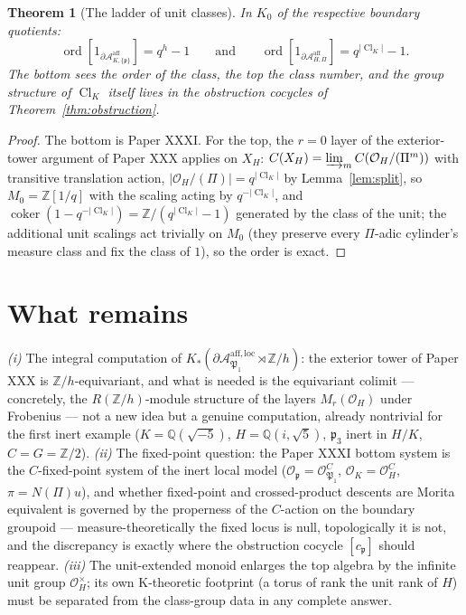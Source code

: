 \documentclass[11pt]{amsart}
\newtheorem{theorem}{Theorem}[section]
\theoremstyle{remark}
\newcommand{\OK}{\mathcal{O}_K}
\newcommand{\OH}{\mathcal{O}_H}
\newcommand{\pp}{\mathfrak{p}}
\newcommand{\PP}{\mathfrak{P}}
\newcommand{\Z}{\mathbb{Z}}
\newcommand{\Q}{\mathbb{Q}}
\newcommand{\Cl}{\operatorname{Cl}}
\newcommand{\ord}{\operatorname{ord}}
\newcommand{\Aaff}{\mathcal{A}^{\mathrm{aff}}}
\newcommand{\Aloc}{\mathcal{A}^{\mathrm{aff},\mathrm{loc}}}
\begin{document}
\begin{theorem}[The ladder of unit classes]\label{thm:ladder}
In $K_0$ of the respective boundary quotients:
\[
\ord[1_{\partial\Aaff_{K,\{\pp\}}}]=q^{h}-1
\qquad\text{and}\qquad
\ord[1_{\partial\Aaff_{H,\Pi}}]=q^{|\Cl_K|}-1 .
\]
The bottom sees the \emph{order} of the class, the top the class \emph{number}, and the
group structure of $\Cl_K$ itself lives in the obstruction cocycles of
Theorem~\ref{thm:obstruction}.
\end{theorem}

\begin{proof}
The bottom is Paper XXXI. For the top, the $r=0$ layer of the exterior-tower argument of
Paper XXX applies on $X_H$: $C(X_H)=\varinjlim_mC(\OH/(\Pi^m))$ with transitive
translation action, $|\OH/(\Pi)|=q^{|\Cl_K|}$ by Lemma~\ref{lem:split}, so
$M_0=\Z[1/q]$ with the scaling acting by $q^{-|\Cl_K|}$, and
$\operatorname{coker}(1-q^{-|\Cl_K|})=\Z/(q^{|\Cl_K|}-1)$ generated by the class of the
unit; the additional unit scalings act trivially on $M_0$ (they preserve every
$\Pi$-adic cylinder's measure class and fix the class of $1$), so the order is exact.
\end{proof}

\section{What remains}\label{sec:remaining}

\emph{(i)} The integral computation of
$K_*(\partial\Aloc_{\PP_1}\rtimes\Z/h)$: the exterior tower of Paper XXX
is $\Z/h$-equivariant, and what is needed is the equivariant colimit --- concretely, the
$R(\Z/h)$-module structure of the layers $M_r(\OH)$ under Frobenius --- not a new idea
but a genuine computation, already nontrivial for the first inert example
($K=\Q(\sqrt{-5})$, $H=\Q(i,\sqrt5)$, $\pp_3$ inert in $H/K$, $C=G=\Z/2$).
\emph{(ii)} The fixed-point question: the Paper XXXI bottom system is the $C$-fixed-point
system of the inert local model ($\mathcal O_\pp=\mathcal O_{\PP_1}^{C}$,
$\OK=\OH^{C}$, $\pi=N(\Pi)u$), and whether fixed-point and crossed-product descents are
Morita equivalent is governed by the properness of the $C$-action on the boundary
groupoid --- measure-theoretically the fixed locus is null, topologically it is not, and
the discrepancy is exactly where the obstruction cocycle $[c_\pp]$ should reappear.
\emph{(iii)} The unit-extended monoid enlarges the top algebra by the infinite unit group
$\OH^\times$; its own K-theoretic footprint (a torus of rank the unit rank of $H$) must
be separated from the class-group data in any complete answer.
\end{document}
